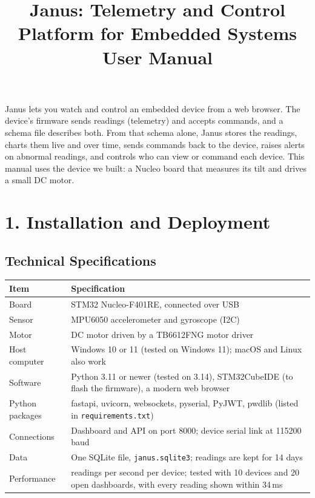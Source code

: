 \documentclass[11pt]{article}
\title{\vspace{-1.5cm}Janus: Telemetry and Control Platform for Embedded Systems\\\large User Manual}
\author{}
\date{}
\begin{document}
\maketitle
\vspace{-1cm}

Janus lets you watch and control an embedded device from a web browser. The device's firmware sends readings (telemetry) and accepts commands, and a schema file describes both. From that schema alone, Janus stores the readings, charts them live and over time, sends commands back to the device, raises alerts on abnormal readings, and controls who can view or command each device. This manual uses the device we built: a Nucleo board that measures its tilt and drives a small DC motor.

\section{1. Installation and Deployment}

\subsection{Technical Specifications}

\begin{center}
\begin{tabularx}{\textwidth}{@{} l >{\raggedright\arraybackslash}X @{}}
\toprule
\textbf{Item} & \textbf{Specification} \\
\midrule
Board & STM32 Nucleo-F401RE, connected over USB \\
Sensor & MPU6050 accelerometer and gyroscope (I2C) \\
Motor & DC motor driven by a TB6612FNG motor driver \\
Host computer & Windows 10 or 11 (tested on Windows 11); macOS and Linux also work \\
Software & Python 3.11 or newer (tested on 3.14), STM32CubeIDE (to flash the firmware), a modern web browser \\
Python packages & fastapi, uvicorn, websockets, pyserial, PyJWT, pwdlib (listed in \texttt{requirements.txt}) \\
Connections & Dashboard and API on port 8000; device serial link at 115200 baud \\
Data & One SQLite file, \texttt{janus.sqlite3}; readings are kept for 14 days \\
Performance & 10 readings per second per device; tested with 10 devices and 20 open dashboards, with every reading shown within 34\,ms \\
\bottomrule
\end{tabularx}
\end{center}
\end{document}
